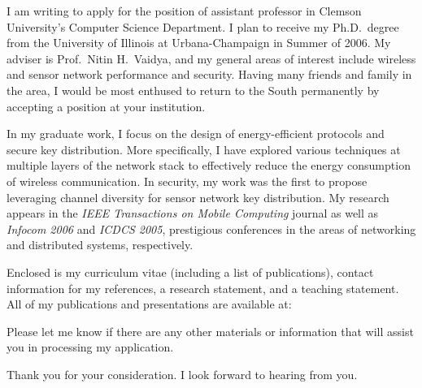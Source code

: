 \documentclass[10pt,stdletter,dateno]{newlfm}
\begin{document}
	\begin{newlfm}
		
		I am writing to apply for the position of assistant
		professor in Clemson University's Computer Science Department.  I plan to receive my
		Ph.D.\ degree from the University of Illinois at
		Urbana-Champaign in Summer of 2006.  My adviser is
		Prof.\ Nitin H.\ Vaidya, and my general areas of interest
		include wireless and sensor network performance and security.
		Having many friends and family in the area, I would be
		most enthused to return to the South permanently by accepting
		a position at your institution.
		
		In my graduate work, I focus on the design of
		energy-efficient protocols and secure key distribution.
		More specifically, I have explored various techniques at
		multiple layers of the network stack to effectively reduce
		the energy consumption of wireless communication.  In security,
		my work was the first to propose leveraging channel diversity
		for sensor network key distribution.  My research appears in 
		the \textit{IEEE Transactions on Mobile Computing} journal as
		well as \textit{Infocom 2006} and \textit{ICDCS 2005},
		prestigious conferences in the areas of networking and distributed
		systems, respectively.
		
		Enclosed is my curriculum vitae (including a list of
		publications), contact information for my references, a research
		statement, and a teaching statement.  All of my publications and
		presentations are available at:
		
		
		Please let me know if there are any other materials
		or information that will assist you in processing my application.
		
		Thank you for your consideration.  I look forward to
		hearing from you.
		
	\end{newlfm}
\end{document}
